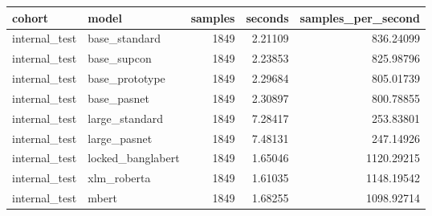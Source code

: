 \begin{tabular}{llrrr}
\toprule
cohort & model & samples & seconds & samples\_per\_second \\
\midrule
internal\_test & base\_standard & 1849 & 2.21109 & 836.24099 \\
internal\_test & base\_supcon & 1849 & 2.23853 & 825.98796 \\
internal\_test & base\_prototype & 1849 & 2.29684 & 805.01739 \\
internal\_test & base\_pasnet & 1849 & 2.30897 & 800.78855 \\
internal\_test & large\_standard & 1849 & 7.28417 & 253.83801 \\
internal\_test & large\_pasnet & 1849 & 7.48131 & 247.14926 \\
internal\_test & locked\_banglabert & 1849 & 1.65046 & 1120.29215 \\
internal\_test & xlm\_roberta & 1849 & 1.61035 & 1148.19542 \\
internal\_test & mbert & 1849 & 1.68255 & 1098.92714 \\
\bottomrule
\end{tabular}
